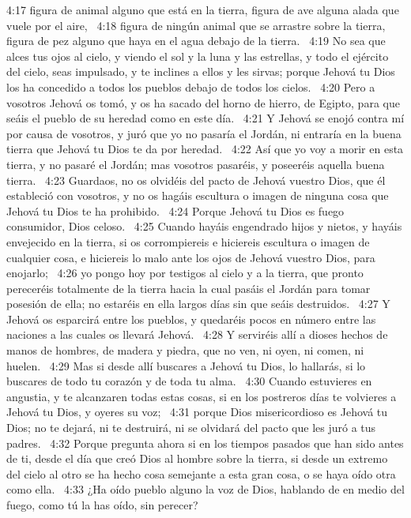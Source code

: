 4:17 figura de animal alguno que está en la tierra, figura de ave alguna alada que vuele por el aire,  
4:18 figura de ningún animal que se arrastre sobre la tierra, figura de pez alguno que haya en el agua debajo de la tierra.  
4:19 No sea que alces tus ojos al cielo, y viendo el sol y la luna y las estrellas, y todo el ejército del cielo, seas impulsado, y te inclines a ellos y les sirvas; porque Jehová tu Dios los ha concedido a todos los pueblos debajo de todos los cielos.  
4:20 Pero a vosotros Jehová os tomó, y os ha sacado del horno de hierro, de Egipto, para que seáis el pueblo de su heredad como en este día.  
4:21 Y Jehová se enojó contra mí por causa de vosotros, y juró que yo no pasaría el Jordán, ni entraría en la buena tierra que Jehová tu Dios te da por heredad.  
4:22 Así que yo voy a morir en esta tierra, y no pasaré el Jordán; mas vosotros pasaréis, y poseeréis aquella buena tierra.  
4:23 Guardaos, no os olvidéis del pacto de Jehová vuestro Dios, que él estableció con vosotros, y no os hagáis escultura o imagen de ninguna cosa que Jehová tu Dios te ha prohibido.  
4:24 Porque Jehová tu Dios es fuego consumidor, Dios celoso.  
4:25 Cuando hayáis engendrado hijos y nietos, y hayáis envejecido en la tierra, si os corrompiereis e hiciereis escultura o imagen de cualquier cosa, e hiciereis lo malo ante los ojos de Jehová vuestro Dios, para enojarlo;  
4:26 yo pongo hoy por testigos al cielo y a la tierra, que pronto pereceréis totalmente de la tierra hacia la cual pasáis el Jordán para tomar posesión de ella; no estaréis en ella largos días sin que seáis destruidos.  
4:27 Y Jehová os esparcirá entre los pueblos, y quedaréis pocos en número entre las naciones a las cuales os llevará Jehová.  
4:28 Y serviréis allí a dioses hechos de manos de hombres, de madera y piedra, que no ven, ni oyen, ni comen, ni huelen.  
4:29 Mas si desde allí buscares a Jehová tu Dios, lo hallarás, si lo buscares de todo tu corazón y de toda tu alma.  
4:30 Cuando estuvieres en angustia, y te alcanzaren todas estas cosas, si en los postreros días te volvieres a Jehová tu Dios, y oyeres su voz;  
4:31 porque Dios misericordioso es Jehová tu Dios; no te dejará, ni te destruirá, ni se olvidará del pacto que les juró a tus padres.  
4:32 Porque pregunta ahora si en los tiempos pasados que han sido antes de ti, desde el día que creó Dios al hombre sobre la tierra, si desde un extremo del cielo al otro se ha hecho cosa semejante a esta gran cosa, o se haya oído otra como ella.  
4:33 ¿Ha oído pueblo alguno la voz de Dios, hablando de en medio del fuego, como tú la has oído, sin perecer?  
